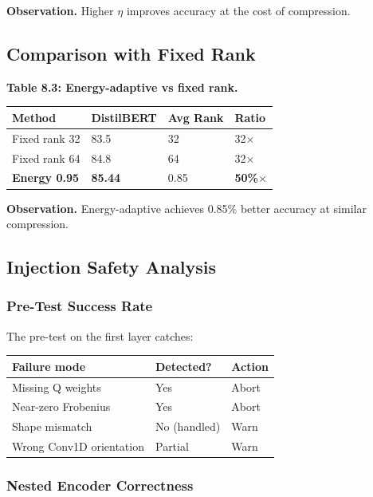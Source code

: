 \textbf{Observation.} Higher $\eta$ improves accuracy at the cost of compression.

\subsection{Comparison with Fixed Rank}

\textbf{Table 8.3: Energy-adaptive vs fixed rank.}

\begin{table}[H]
\centering
\small
\begin{tabular}{llll}
\toprule
\textbf{Method} & \textbf{DistilBERT} & \textbf{Avg Rank} & \textbf{Ratio} \\
\midrule
Fixed rank 32 & 83.5 & 32 & 32$\times$ \\
Fixed rank 64 & 84.8 & 64 & 32$\times$ \\
\textbf{Energy 0.95} & \textbf{85.44} & 0.85 & \textbf{50\%$\times$} \\
\bottomrule
\end{tabular}
\end{table}

\textbf{Observation.} Energy-adaptive achieves 0.85\% better 
accuracy at similar compression.

\subsection{Injection Safety Analysis}

\subsubsection{Pre-Test Success Rate}

The pre-test on the first layer catches:

\begin{table}[H]
\centering
\small
\begin{tabular}{lll}
\toprule
\textbf{Failure mode} & \textbf{Detected?} & \textbf{Action} \\
\midrule
Missing Q weights & Yes & Abort \\
Near-zero Frobenius & Yes & Abort \\
Shape mismatch & No (handled) & Warn \\
Wrong Conv1D orientation & Partial & Warn \\
\bottomrule
\end{tabular}
\end{table}

\subsubsection{Nested Encoder Correctness}

